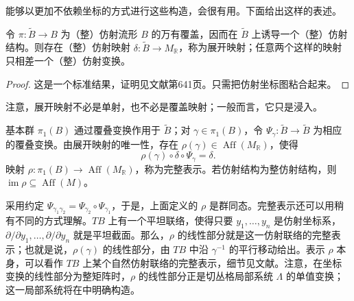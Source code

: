 能够以更加不依赖坐标的方式进行这些构造，会很有用。下面给出这样的表述。

\begin{proposition}\label{prop:6.5}
令 $\pi\colon\widetilde B\to B$ 为（整）仿射流形 $B$ 的万有覆盖，因而在 $\widetilde B$ 上诱导一个（整）仿射结构。则存在（整）仿射映射 $\delta\colon\widetilde B\to M_{\mathbb R}$，称为展开映射；任意两个这样的映射只相差一个（整）仿射变换。
\end{proposition}
\begin{proof}
这是一个标准结果，证明见文献第641页。只需把仿射坐标图粘合起来。
\end{proof}

注意，展开映射不必是单射，也不必是覆盖映射；一般而言，它只是浸入。

\begin{definition}\label{def:6.6}
基本群 $\pi_1(B)$ 通过覆叠变换作用于 $\widetilde B$；对 $\gamma\in\pi_1(B)$，令 $\Psi_\gamma\colon\widetilde B\to\widetilde B$ 为相应的覆叠变换。由展开映射的唯一性，存在 $\rho(\gamma)\in\operatorname{Aff}(M_{\mathbb R})$，使得
\[
\rho(\gamma)\circ\delta\circ\Psi_\gamma=\delta.
\]
映射 $\rho\colon\pi_1(B)\to\operatorname{Aff}(M_{\mathbb R})$，称为完整表示。若仿射结构为整仿射结构，则 $\operatorname{im}\rho\subseteq\operatorname{Aff}(M)$。
\end{definition}

采用约定 $\Psi_{\gamma_1\gamma_2}=\Psi_{\gamma_2}\circ\Psi_{\gamma_1}$，于是，上面定义的 $\rho$ 是群同态。完整表示还可以用稍有不同的方式理解。$TB$ 上有一个平坦联络，使得只要 $y_1,\ldots,y_n$ 是仿射坐标系，$\partial/\partial y_1,\ldots,\partial/\partial y_n$ 就是平坦截面。那么，$\rho$ 的线性部分就是这一仿射联络的完整表示；也就是说，$\rho(\gamma)$ 的线性部分，由 $TB$ 中沿 $\gamma^{-1}$ 的平行移动给出。表示 $\rho$ 本身，可以看作 $TB$ 上某个自然仿射联络的完整表示，细节见文献。注意，在坐标变换的线性部分为整矩阵时，$\rho$ 的线性部分正是切丛格局部系统 $\Lambda$ 的单值变换；这一局部系统将在中明确构造。

